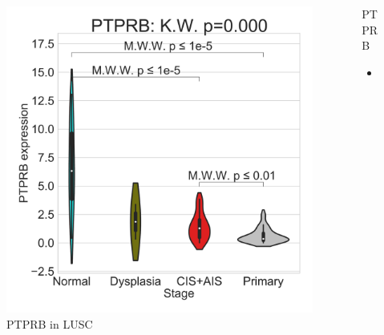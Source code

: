 \documentclass{beamer}
\begin{document}
\begin{frame}[allowframebreaks]
                    \begin{columns}
                        \begin{column}{0.4 \textwidth}
                            \begin{figure}
                                \includegraphics[width=\linewidth]{figures/DEG/Violin/STAR.TPM.SQC.violin/PTPRB.pdf}
                                \caption{PTPRB in LUSC}
                            \end{figure}
                        \end{column}
                        \begin{column}{0.55 \textwidth}
                            \begin{block}{PTPRB}
                                \begin{itemize}
                                    \item
                                \end{itemize}
                            \end{block}
                        \end{column}
                    \end{columns}
                \end{frame}
\end{document}
